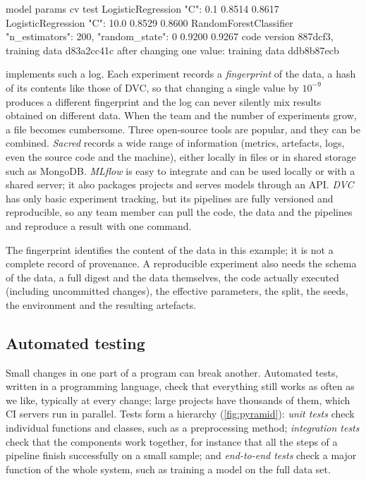 \begin{pyoutput}
                 model                                   params     cv   test
    LogisticRegression                               {"C": 0.1} 0.8514 0.8617
    LogisticRegression                              {"C": 10.0} 0.8529 0.8600
RandomForestClassifier {"n_estimators": 200, "random_state": 0} 0.9200 0.9267
code version 887dcf3, training data d83a2cc41c
after changing one value: training data ddb8b87ecb
\end{pyoutput}

 implements such a log. Each experiment records a \emph{fingerprint} of the data, a hash
of its contents like those of DVC, so that changing a single value by $10^{-9}$ produces a different
fingerprint and the log can never silently mix results obtained on different data. When the team and the
number of experiments grow, a file becomes cumbersome. Three open-source tools are popular, and they can be combined. \emph{Sacred} \citep{greff2017sacred} records a wide
range of information (metrics, artefacts, logs, even the source code and the machine), either locally in files or in shared storage such as MongoDB. \emph{MLflow} \citep{zaharia2018accelerating} is easy to integrate and can be used locally or with a
shared server; it also packages projects and serves models through an API. \emph{DVC} has only basic
experiment tracking, but its pipelines are fully versioned and reproducible, so any team member can pull the code, the data and the pipelines and reproduce a result with one command.

The fingerprint identifies the content of the data in this example; it is not a complete record of
provenance. A reproducible experiment also needs the schema of the data, a full digest and the data
themselves, the code actually executed (including uncommitted changes), the effective parameters, the
split, the seeds, the environment and the resulting artefacts.

\subsection{Automated testing}

Small changes in one part of a program can break another. Automated tests, written in a programming
language, check that everything still works as often as we like, typically at every change; large projects
have thousands of them, which CI servers run in parallel. Tests form a hierarchy (\cref{fig:pyramid}):
\emph{unit tests} check individual functions and classes, such as a preprocessing method; \emph{integration
tests} check that the components work together, for instance that all the steps of a pipeline finish
successfully on a small sample; and \emph{end-to-end tests} check a major function of the whole system, such
as training a model on the full data set.

